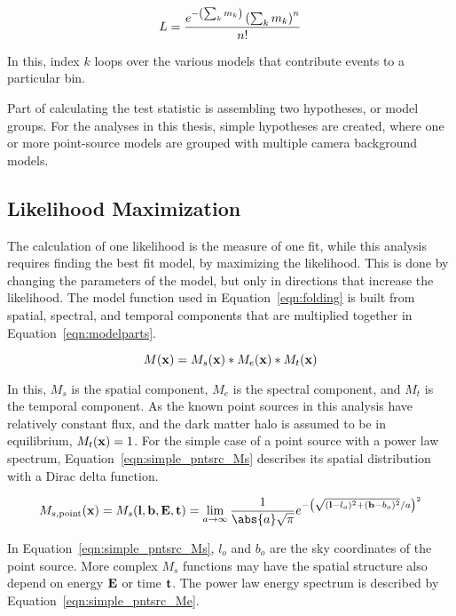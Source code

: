   \begin{equation}\label{eqn:combinemodels}
    L = \frac{e^{- \left ( \sum_k m_k \right ) } \left ( \sum_k m_k \right )^n}{n!}
  \end{equation}

  In this, index $k$ loops over the various models that contribute events to a particular bin.
  
  Part of calculating the test statistic is assembling two hypotheses, or model groups.
  For the analyses in this thesis, simple hypotheses are created, where one or more point-source models are grouped with multiple camera background models.
  
  
  \subsection{Likelihood Maximization}\label{subsec:likemax}
  The calculation of one likelihood is the measure of one fit, while this analysis requires finding the best fit model, by maximizing the likelihood.
  This is done by changing the parameters of the model, but only in directions that increase the likelihood.
  The model function used in Equation~\ref{eqn:folding} is built from spatial, spectral, and temporal components that are multiplied together in Equation~\ref{eqn:modelparts}.

  \begin{equation}\label{eqn:modelparts}
    M(\mathbf{x }) = M_s(\mathbf{x }) * M_e(\mathbf{x }) * M_t(\mathbf{x })
  \end{equation}
  
  In this, $M_s$ is the spatial component, $M_e$ is the spectral component, and $M_t$ is the temporal component.
  As the known point sources in this analysis have relatively constant flux, and the dark matter halo is assumed to be in equilibrium, $M_t(\mathbf{x })=1$.
  For the simple case of a point source with a power law spectrum, Equation~\ref{eqn:simple_pntsrc_Ms} describes its spatial distribution with a Dirac delta function.
  
  \begin{equation}\label{eqn:simple_pntsrc_Ms}
    M_{s,\textrm{point}}(\xtrue) = M_s(\ltrue,\btrue,\Etrue,\ttrue) = \lim_{a\to\infty} \frac{1}{ \abs{a} \sqrt{\pi} } e^{ - \left ( \sqrt{ (\ltrue-l_o)^2 + (\btrue-b_o)^2 }/a \right )^2 }
  \end{equation}
  
  In Equation~\ref{eqn:simple_pntsrc_Ms}, $l_o$ and $b_o$ are the sky coordinates of the point source.
  More complex $M_s$ functions may have the spatial structure also depend on energy $\mathbf{E }$ or time $\mathbf{t }$.
  The power law energy spectrum is described by Equation~\ref{eqn:simple_pntsrc_Me}.
  

